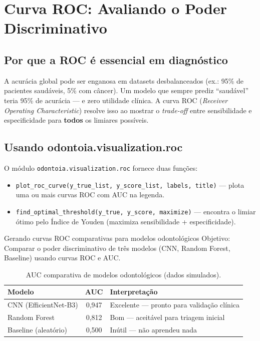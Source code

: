 \section{Curva ROC: Avaliando o Poder Discriminativo}

\subsection{Por que a ROC é essencial em diagnóstico}

A acurácia global pode ser enganosa em datasets desbalanceados (ex.: 95\%
de pacientes saudáveis, 5\% com câncer). Um modelo que sempre prediz
``saudável'' teria 95\% de acurácia — e zero utilidade clínica. A curva
ROC (\textit{Receiver Operating Characteristic}) resolve isso ao mostrar
o \textit{trade-off} entre sensibilidade e especificidade para \textbf{todos}
os limiares possíveis.

 

\subsection{Usando odontoia.visualization.roc}

O módulo \texttt{odontoia.visualization.roc} fornece duas funções:

\begin{itemize}
  \item \texttt{plot\_roc\_curve(y\_true\_list, y\_score\_list, labels,
    title)} — plota uma ou mais curvas ROC com AUC na legenda.
  \item \texttt{find\_optimal\_threshold(y\_true, y\_score, maximize)} —
    encontra o limiar ótimo pelo Índice de Youden (maximiza sensibilidade
    + especificidade).
\end{itemize}

\begin{pratica}{Gerando curvas ROC comparativas para modelos odontológicos}
  Objetivo: Comparar o poder discriminativo de três modelos (CNN, Random
  Forest, Baseline) usando curvas ROC e AUC.
\end{pratica}

\begin{table}[H]
  \centering
  \caption{AUC comparativa de modelos odontológicos (dados simulados).}
  \label{tab:roc-comparison}
  \begin{tabularx}{\textwidth}{lcX}
    \toprule
    \textbf{Modelo} & \textbf{AUC} & \textbf{Interpretação} \\
    \midrule
    CNN (EfficientNet-B3) & 0,947 & Excelente — pronto para validação clínica \\
    Random Forest & 0,812 & Bom — aceitável para triagem inicial \\
    Baseline (aleatório) & 0,500 & Inútil — não aprendeu nada \\
    \bottomrule
  \end{tabularx}
\end{table}

